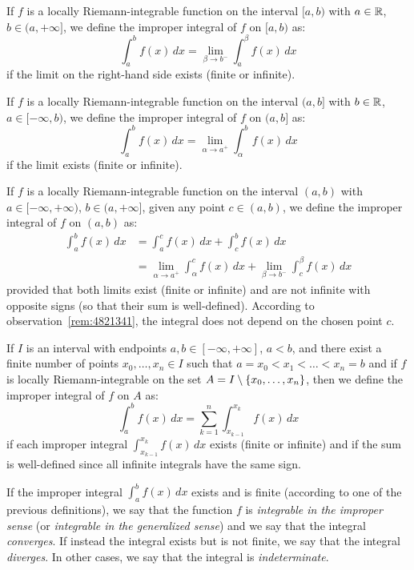 \begin{definition}
\label{def:integrale_improprio}
If $f$ is a locally Riemann-integrable function on the interval $[a,b)$ with
$a\in {\mathbb R}$, $b\in (a,+\infty]$, we define the improper integral of $f$ on
$[a,b)$ as:
\[
  \int_a^b f(x)\, dx = \lim_{\beta \to b^-} \int_a^\beta f(x)\, dx
\]
if the limit on the right-hand side exists (finite or infinite).

If $f$ is a locally Riemann-integrable function on the interval $(a,b]$ with
$b\in {\mathbb R}$, $a\in [-\infty,b)$, we define the improper integral of $f$ on
$(a,b]$ as:
\[
  \int_a^b f(x)\, dx = \lim_{\alpha \to a^+} \int_\alpha^b f(x)\, dx
\]
if the limit exists (finite or infinite).

If $f$ is a locally Riemann-integrable function on the interval $(a,b)$ with
$a\in [-\infty,+\infty)$, $b\in(a,+\infty]$, given any point $c\in (a,b)$, we
define the improper integral of $f$ on $(a,b)$ as:
\begin{align*}
  \int_a^b f(x)\, dx &=
  \int_a^c f(x)\, dx + \int_c^b f(x)\, dx \\
  &= \lim_{\alpha \to a^+}\int_\alpha^c f(x)\,dx
    + \lim_{\beta\to b^-}\int_c^\beta f(x)\, dx
\end{align*}
provided that both limits exist (finite or infinite) and are not infinite with
opposite signs (so that their sum is well-defined). According to
observation~\ref{rem:4821341}, the integral does not depend on the chosen point
$c$.

If $I$ is an interval with endpoints $a,b\in [-\infty, +\infty]$, $a<b$, and
there exist a finite number of points $x_0,\dots,x_n \in I$ such that $a = x_0 <
x_1 < \dots < x_n = b$ and if $f$ is locally Riemann-integrable on the set
$A=I\setminus{\left\{ x_0, \dots, x_n \right\}}$, then we define the improper integral of
$f$ on $A$ as:
\[
  \int_a^b f(x)\, dx = \sum_{k=1}^n \int_{x_{k-1}}^{x_k} f(x)\, dx
\]
if each improper integral $\int_{x_{k-1}}^{x_k} f(x)\, dx$ exists (finite or
infinite) and if the sum is well-defined since all infinite integrals have the
same sign.

If the improper integral $\int_a^b f(x)\, dx$ exists and is finite (according to
one of the previous definitions), we say that the function $f$ is
 \emph{integrable in the improper sense} (or
\emph{integrable in the generalized sense}) and we say that the integral
\emph{converges}. %
%
%
%
If instead the integral exists but is not finite, we say that the integral
\emph{diverges}. %
%
%
%
In other cases, we say that the integral is \emph{indeterminate}.
%
%
%


\end{definition}
